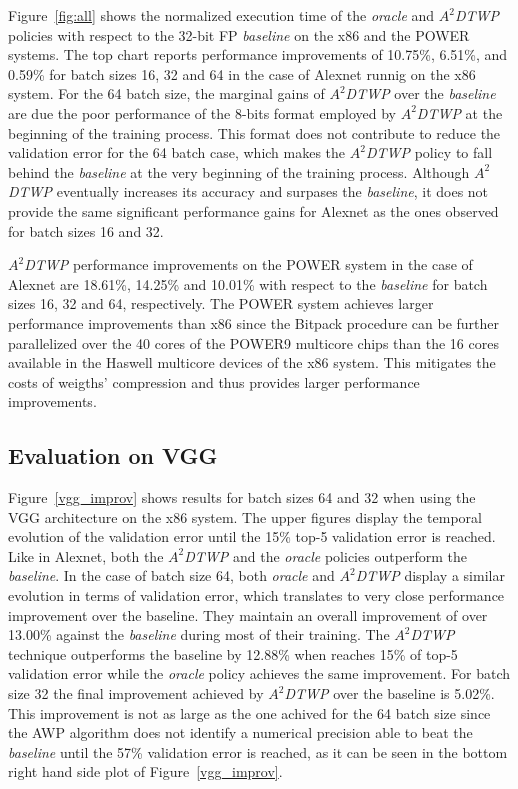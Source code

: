 Figure~\ref{fig:all} shows the normalized execution time of the \textit{oracle} 
and \textit{$A^2$DTWP} policies with respect to the 32-bit FP \textit{baseline} on the x86 and the POWER systems. 
The top chart reports performance improvements of 10.75\%, 6.51\%, and 0.59\% for batch sizes 16, 32 and 64 in
the case of Alexnet runnig on the x86 system.  
For the 64 batch size, the marginal gains of \textit{$A^2$DTWP} over the \textit{baseline} are due the poor performance of the 8-bits format employed by \textit{$A^2$DTWP} at the beginning of the training process.
This format does not contribute to reduce the validation error for the 64 batch case, which makes the \textit{$A^2$DTWP} policy to fall behind the \textit{baseline} at the very beginning of the training process.  
Although \textit{$A^2$DTWP} eventually increases its accuracy and surpases the \textit{baseline}, it does not provide the same significant performance gains for Alexnet as the ones observed for batch sizes 16 and 32.

\textit{$A^2$DTWP} performance improvements on the POWER system in the case of 
Alexnet are 18.61\%, 14.25\% and 10.01\% with respect to the \textit{baseline} for batch sizes 16, 32 and 64, respectively.  
The POWER system achieves larger performance improvements than x86 since the 
Bitpack procedure can be further parallelized over the 40 cores of the POWER9 
multicore chips than the 16 cores available in the Haswell multicore devices of the x86 system. 
This mitigates the costs of weigths' compression and thus provides larger performance improvements. 

\subsection{Evaluation on VGG}
\label{sec:VGG}

Figure~\ref{vgg_improv} shows results for batch sizes 64 and 32 when using the 
VGG architecture on the x86 system. 
The upper figures display the temporal evolution of the validation error until the 15\% top-5 validation error is reached.
Like in Alexnet, both the \textit{$A^2$DTWP} and the \textit{oracle} policies outperform the \textit{baseline}.
In the case of batch size 64, both \textit{oracle} and \textit{$A^2$DTWP} 
display a similar evolution in terms of validation error, which translates to 
very close performance improvement over the baseline. 
They maintain an overall improvement of over 13.00\% against the \textit{baseline} 
during most of their training. The \textit{$A^2$DTWP} technique outperforms the baseline by 
12.88\% when reaches 15\% of top-5 validation error while the 
\textit{oracle} policy achieves the same improvement.
For batch size 32 the final improvement achieved by \textit{$A^2$DTWP} over the baseline is 5.02\%.
This improvement is not as large as the one achived for the 64 batch size since the AWP algorithm does not identify a numerical precision able to beat the \textit{baseline} until the 57\% validation error is reached, as it can be seen in the bottom right hand side plot of Figure~\ref{vgg_improv}. 

